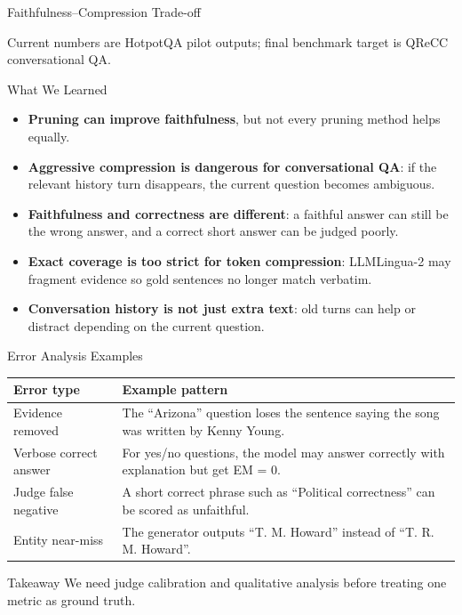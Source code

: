 \documentclass[aspectratio=169,11pt]{beamer}
\begin{document}
\begin{frame}{Faithfulness--Compression Trade-off}

  \vspace{0.15em}
  \scriptsize Current numbers are HotpotQA pilot outputs; final benchmark target is QReCC conversational QA.
\end{frame}

\begin{frame}{What We Learned}
  \begin{itemize}
    \item \textbf{Pruning can improve faithfulness}, but not every pruning method helps equally.
    \item \textbf{Aggressive compression is dangerous for conversational QA}: if the relevant history turn disappears, the current question becomes ambiguous.
    \item \textbf{Faithfulness and correctness are different}: a faithful answer can still be the wrong answer, and a correct short answer can be judged poorly.
    \item \textbf{Exact coverage is too strict for token compression}: LLMLingua-2 may fragment evidence so gold sentences no longer match verbatim.
    \item \textbf{Conversation history is not just extra text}: old turns can help or distract depending on the current question.
  \end{itemize}
\end{frame}

\begin{frame}{Error Analysis Examples}
  \small
  \begin{tabular}{p{}p{}}
    \toprule
    Error type & Example pattern \\
    \midrule
    Evidence removed & The ``Arizona'' question loses the sentence saying the song was written by Kenny Young. \\
    Verbose correct answer & For yes/no questions, the model may answer correctly with explanation but get EM = 0. \\
    Judge false negative & A short correct phrase such as ``Political correctness'' can be scored as unfaithful. \\
    Entity near-miss & The generator outputs ``T. M. Howard'' instead of ``T. R. M. Howard''. \\
    \bottomrule
  \end{tabular}

  \vspace{0.8em}
  \begin{block}{Takeaway}
    We need judge calibration and qualitative analysis before treating one metric as ground truth.
  \end{block}
\end{frame}
\end{document}
